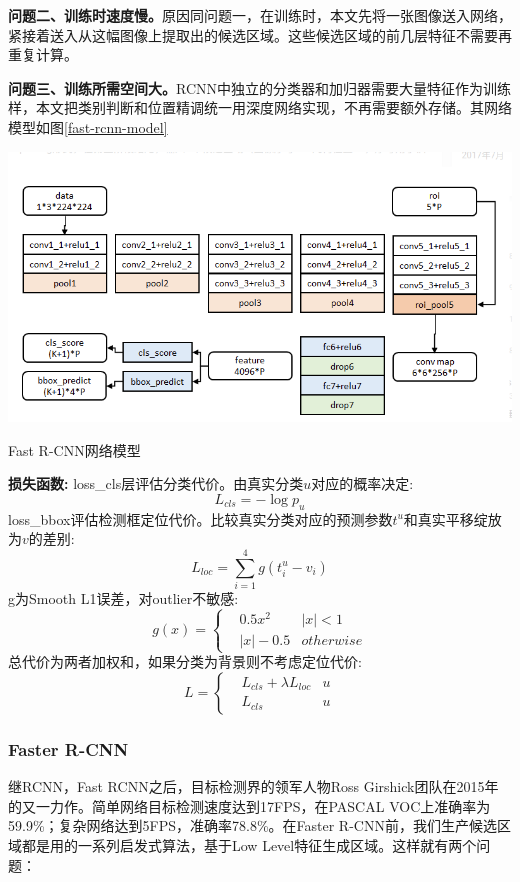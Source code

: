 \textbf{问题二、训练时速度慢。}原因同问题一，在训练时，本文先将一张图像送入网络，紧接着送入从这幅图像上提取出的候选区域。这些候选区域的前几层特征不需要再重复计算。

\textbf{问题三、训练所需空间大。}RCNN中独立的分类器和加归器需要大量特征作为训练样，本文把类别判断和位置精调统一用深度网络实现，不再需要额外存储。其网络模型如图\ref{fast-rcnn-model}

\begin{uscfigure}
	\includegraphics[width=\textwidth]{./Pictures/fast-rcnn-model.png}	
	\caption{Fast R-CNN网络模型}	
	\label{fast-rcnn-model}
\end{uscfigure}

\textbf{损失函数:}
loss\_cls层评估分类代价。由真实分类$u$对应的概率决定:
\[
	L_{cls} = - \log p_u
\]
loss\_bbox评估检测框定位代价。比较真实分类对应的预测参数$t^u$和真实平移绽放为$v$的差别:
\[
	L_{loc} = \sum_{i=1}^{4} g(t_i^u - v_i)
\]
g为Smooth L1误差，对outlier不敏感:
\begin{equation}
	g(x) = \left \{
		\begin{aligned}
		& 0.5x^2 	 & |x| < 1	\\	
		& |x| - 0.5  &otherwise
		\end{aligned}
		\right .
\end{equation}
总代价为两者加权和，如果分类为背景则不考虑定位代价:
\begin{equation}
	L = \left \{
		\begin{aligned}
		& L_{cls} + \lambda L_{loc} & u\\
		& L_{cls} 					& u
		\end{aligned}
	\right .
\end{equation}
\subsubsection{Faster R-CNN}
继RCNN，Fast RCNN之后，目标检测界的领军人物Ross Girshick团队在2015年的又一力作。简单网络目标检测速度达到17FPS，在PASCAL VOC上准确率为59.9\%；复杂网络达到5FPS，准确率78.8\%。在Faster R-CNN前，我们生产候选区域都是用的一系列启发式算法，基于Low Level特征生成区域。这样就有两个问题：

